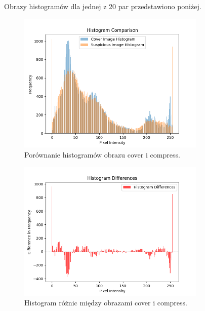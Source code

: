 Obrazy histogramów dla jednej z 20 par przedstawiono poniżej.
\begin{figure}[ht!]
    \centering
    \includegraphics[width=0.8\textwidth]{./img/compress_histogram.png}
    \caption{Porównanie histogramów obrazu cover i compress.}
    \label{fig:histogram_comparison}
\end{figure}

\pagebreak
\begin{figure}[ht!]
    \centering
    \includegraphics[width=0.8\textwidth]{./img/compress_diff_histogram.png}
    \caption{Histogram różnic między obrazami cover i compress.}
    \label{fig:histogram_diff}

\end{figure}

